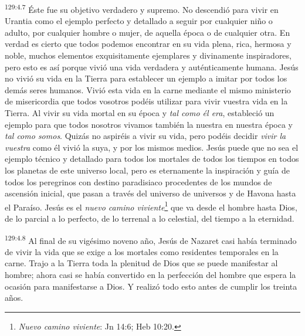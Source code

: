 \par 
\textsuperscript{129:4.7} Éste fue su objetivo verdadero y supremo. No descendió para vivir en Urantia como el ejemplo perfecto y detallado a seguir por cualquier niño o adulto, por cualquier hombre o mujer, de aquella época o de cualquier otra. En verdad es cierto que todos podemos encontrar en su vida plena, rica, hermosa y noble, muchos elementos exquisitamente ejemplares y divinamente inspiradores, pero esto es así porque vivió una vida verdadera y auténticamente humana. Jesús no vivió su vida en la Tierra para establecer un ejemplo a imitar por todos los demás seres humanos. Vivió esta vida en la carne mediante el mismo ministerio de misericordia que todos vosotros podéis utilizar para vivir vuestra vida en la Tierra. Al vivir su vida mortal en su época y \textit{tal como él era}, estableció un ejemplo para que todos nosotros vivamos también la nuestra en nuestra época y \textit{tal como somos}. Quizás no aspiréis a vivir su vida, pero podéis decidir \textit{vivir la vuestra} como él vivió la suya, y por los mismos medios. Jesús puede que no sea el ejemplo técnico y detallado para todos los mortales de todos los tiempos en todos los planetas de este universo local, pero es eternamente la inspiración y guía de todos los peregrinos con destino paradisiaco procedentes de los mundos de ascensión inicial, que pasan a través del universo de universos y de Havona hasta el Paraíso. Jesús es el \textit{nuevo camino viviente}\footnote{\textit{Nuevo camino viviente}: Jn 14:6; Heb 10:20.} que va desde el hombre hasta Dios, de lo parcial a lo perfecto, de lo terrenal a lo celestial, del tiempo a la eternidad.

\par 
\textsuperscript{129:4.8} Al final de su vigésimo noveno año, Jesús de Nazaret casi había terminado de vivir la vida que se exige a los mortales como residentes temporales en la carne. Trajo a la Tierra toda la plenitud de Dios que se puede manifestar al hombre; ahora casi se había convertido en la perfección del hombre que espera la ocasión para manifestarse a Dios. Y realizó todo esto antes de cumplir los treinta años.